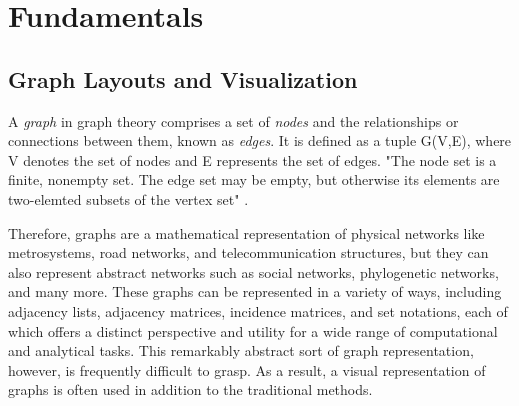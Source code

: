 \documentclass[bachelor, english]{algothesis}
\begin{document}
\chapter{Fundamentals}

\section{Graph Layouts and Visualization}
\begin{definition}
    A \emph{graph} in graph theory comprises a set of \emph{nodes} and the relationships or connections between them, known as \emph{edges}. It is defined as a tuple G(V,E), where V denotes the set of nodes and E represents the set of edges. "The node set is a finite, nonempty set. The edge set may be empty, but otherwise its elements are two-elemted subsets of the vertex set" \cite{graph_definition}.
\end{definition}   
\noindent 
Therefore, graphs are a mathematical representation of physical networks like metrosystems, road networks, and telecommunication structures, but they can also represent abstract networks such as social networks, phylogenetic networks, and many more. These graphs can be represented in a variety of ways, including adjacency lists, adjacency matrices, incidence matrices, and set notations, each of which offers a distinct perspective and utility for a wide range of computational and analytical tasks. This remarkably abstract sort of graph representation, however, is frequently difficult to grasp. As a result, a visual representation of graphs is often used in addition to the traditional methods.
\end{document}
